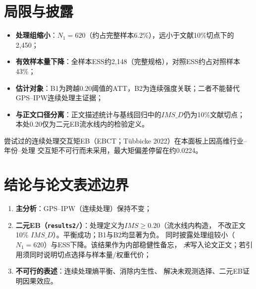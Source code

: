 \documentclass[11pt]{article}
\begin{document}
\section{局限与披露}

\begin{itemize}
  \item \textbf{处理组缩小}：\(N_1=620\)（约占完整样本6.2\%），远小于文献10\%切点下的2,450；
  \item \textbf{有效样本量下降}：全样本ESS约2,148（完整规格），对照ESS约占对照样本43\%；
  \item \textbf{估计对象}：B1为跨越0.20阈值的ATT，B2为连续强度关联；二者不能替代
        GPS--IPW连续处理主证据；
  \item \textbf{与正文口径分离}：正文描述统计与基线回归中的\(IMS\_D\)仍为10\%文献切点；
        本处0.20仅为二元EB流水线内的检验定义。
\end{itemize}

尝试过的连续处理交互矩EB（EBCT；T\"ubbicke 2022）在本面板上因高维行业--年份--处理
交互矩不可行而未采用，最大矩偏差停留在约0.0224。

\section{结论与论文表述边界}

\begin{enumerate}
  \item \textbf{主分析}：GPS--IPW（连续处理）保持不变；
  \item \textbf{二元EB（\texttt{results2/}）}：处理定义为\(IMS\ge0.20\)（流水线内构造，
        不改正文10\% \(IMS\_D\)）。平衡成功；B1与B2均显著为负。
        同时披露处理组较小（\(N_1=620\)）与ESS下降。该结果作为内部稳健性备忘，
        \emph{未}写入论文正文；若引用须同时说明切点选择与样本量/权重代价；
  \item \textbf{不可行的表述}：连续处理熵平衡、消除内生性、
        解决未观测选择、二元EB证明因果效应。
\end{enumerate}
\end{document}
